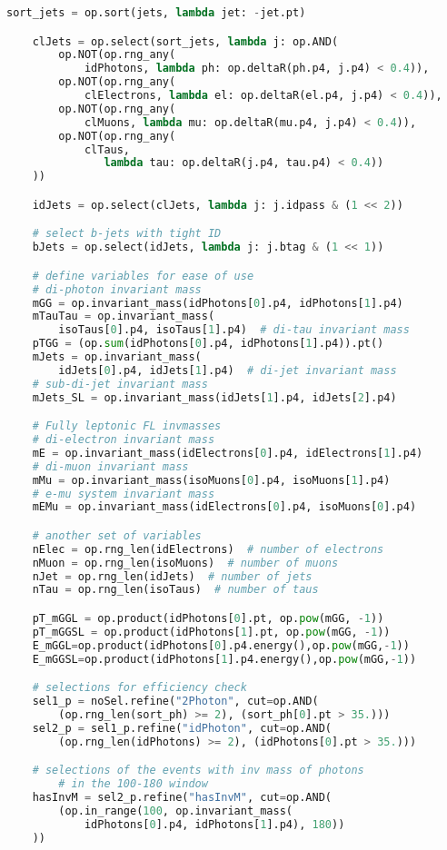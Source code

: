 \begin{lstlisting}[language=Python, caption=Python module of the analysis used in Bamboo framework, label={bamboocode}]
    sort_jets = op.sort(jets, lambda jet: -jet.pt)

    clJets = op.select(sort_jets, lambda j: op.AND(
        op.NOT(op.rng_any(
            idPhotons, lambda ph: op.deltaR(ph.p4, j.p4) < 0.4)),
        op.NOT(op.rng_any(
            clElectrons, lambda el: op.deltaR(el.p4, j.p4) < 0.4)),
        op.NOT(op.rng_any(
            clMuons, lambda mu: op.deltaR(mu.p4, j.p4) < 0.4)),
        op.NOT(op.rng_any(
            clTaus,
               lambda tau: op.deltaR(j.p4, tau.p4) < 0.4))
    ))

    idJets = op.select(clJets, lambda j: j.idpass & (1 << 2))

    # select b-jets with tight ID
    bJets = op.select(idJets, lambda j: j.btag & (1 << 1))

    # define variables for ease of use
    # di-photon invariant mass
    mGG = op.invariant_mass(idPhotons[0].p4, idPhotons[1].p4)
    mTauTau = op.invariant_mass(
        isoTaus[0].p4, isoTaus[1].p4)  # di-tau invariant mass
    pTGG = (op.sum(idPhotons[0].p4, idPhotons[1].p4)).pt()
    mJets = op.invariant_mass(
        idJets[0].p4, idJets[1].p4)  # di-jet invariant mass
    # sub-di-jet invariant mass
    mJets_SL = op.invariant_mass(idJets[1].p4, idJets[2].p4)

    # Fully leptonic FL invmasses
    # di-electron invariant mass
    mE = op.invariant_mass(idElectrons[0].p4, idElectrons[1].p4)
    # di-muon invariant mass
    mMu = op.invariant_mass(isoMuons[0].p4, isoMuons[1].p4)
    # e-mu system invariant mass
    mEMu = op.invariant_mass(idElectrons[0].p4, isoMuons[0].p4)

    # another set of variables
    nElec = op.rng_len(idElectrons)  # number of electrons
    nMuon = op.rng_len(isoMuons)  # number of muons
    nJet = op.rng_len(idJets)  # number of jets
    nTau = op.rng_len(isoTaus)  # number of taus

    pT_mGGL = op.product(idPhotons[0].pt, op.pow(mGG, -1))
    pT_mGGSL = op.product(idPhotons[1].pt, op.pow(mGG, -1))
    E_mGGL=op.product(idPhotons[0].p4.energy(),op.pow(mGG,-1))
    E_mGGSL=op.product(idPhotons[1].p4.energy(),op.pow(mGG,-1))

    # selections for efficiency check
    sel1_p = noSel.refine("2Photon", cut=op.AND(
        (op.rng_len(sort_ph) >= 2), (sort_ph[0].pt > 35.)))
    sel2_p = sel1_p.refine("idPhoton", cut=op.AND(
        (op.rng_len(idPhotons) >= 2), (idPhotons[0].pt > 35.)))

    # selections of the events with inv mass of photons 
        # in the 100-180 window
    hasInvM = sel2_p.refine("hasInvM", cut=op.AND(
        (op.in_range(100, op.invariant_mass(
            idPhotons[0].p4, idPhotons[1].p4), 180))
    ))


\end{lstlisting}
